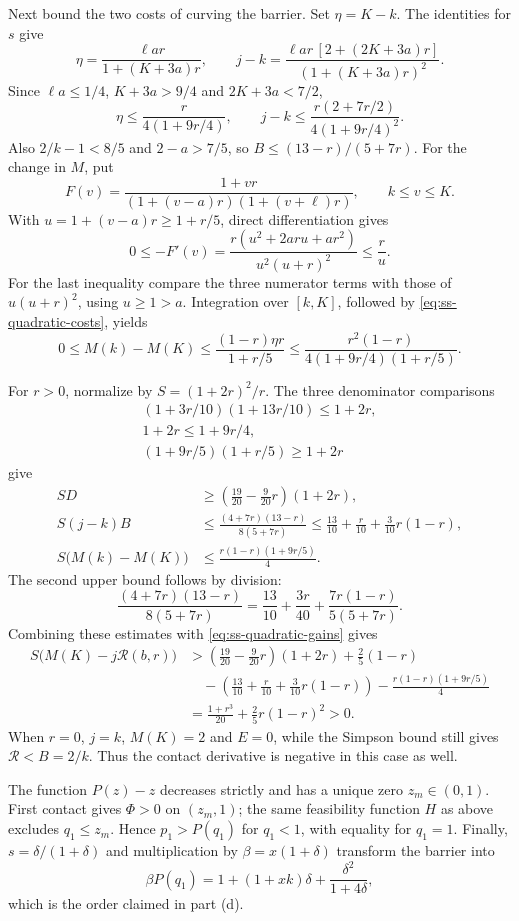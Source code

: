 Next bound the two costs of curving the barrier. Set $\eta=K-k$. The identities for $s$ give
\[
 \eta=\frac{\ell ar}{1+(K+3a)r},\qquad
 j-k=\frac{\ell ar\,[2+(2K+3a)r]}{(1+(K+3a)r)^2}.
\]
Since $\ell a\le1/4$, $K+3a>9/4$ and $2K+3a<7/2$,
\begin{equation}\label{eq:ss-quadratic-costs}
 \eta\le\frac{r}{4(1+9r/4)},\qquad
 j-k\le\frac{r(2+7r/2)}{4(1+9r/4)^2}.
\end{equation}
Also $2/k-1<8/5$ and $2-a>7/5$, so $B\le(13-r)/(5+7r)$.
For the change in $M$, put
\[
 F(v)=\frac{1+vr}{(1+(v-a)r)(1+(v+\ell)r)},\qquad k\le v\le K.
\]
With $u=1+(v-a)r\ge1+r/5$, direct differentiation gives
\[
 0\le-F'(v)=\frac{r(u^2+2aru+ar^2)}{u^2(u+r)^2}\le\frac r u.
\]
For the last inequality compare the three numerator terms with those of $u(u+r)^2$,
using $u\ge1>a$. Integration over $[k,K]$, followed by \eqref{eq:ss-quadratic-costs}, yields
\[
 0\le M(k)-M(K)\le\frac{(1-r)\eta r}{1+r/5}
 \le\frac{r^2(1-r)}{4(1+9r/4)(1+r/5)}.
\]

For $r>0$, normalize by $S=(1+2r)^2/r$.
The three denominator comparisons
\begin{gather*}
 (1+3r/10)(1+13r/10)\le1+2r,\\
 1+2r\le1+9r/4,\\
 (1+9r/5)(1+r/5)\ge1+2r
\end{gather*}
give
\begin{align*}
 SD&\ge\left(\frac{19}{20}-\frac9{20}r\right)(1+2r),\\
 S(j-k)B&\le\frac{(4+7r)(13-r)}{8(5+7r)}
       \le\frac{13}{10}+\frac r{10}+\frac3{10}r(1-r),\\
 S\bigl(M(k)-M(K)\bigr)&\le\frac{r(1-r)(1+9r/5)}4.
\end{align*}
The second upper bound follows by division:
\[
 \frac{(4+7r)(13-r)}{8(5+7r)}
 =\frac{13}{10}+\frac{3r}{40}+\frac{7r(1-r)}{5(5+7r)}.
\]
Combining these estimates with \eqref{eq:ss-quadratic-gains} gives
\begin{align*}
 S\bigl(M(K)-j\mathcal R(b,r)\bigr)
 &>\left(\frac{19}{20}-\frac9{20}r\right)(1+2r)+\frac25(1-r)\\
 &\quad-\left(\frac{13}{10}+\frac r{10}+\frac3{10}r(1-r)\right)
       -\frac{r(1-r)(1+9r/5)}4\\
 &=\frac{1+r^3}{20}+\frac25r(1-r)^2>0.
\end{align*}
When $r=0$, $j=k$, $M(K)=2$ and $E=0$, while the Simpson bound still gives
$\mathcal R<B=2/k$. Thus the contact derivative is negative in this case as well.

The function $P(z)-z$ decreases strictly and has a unique zero $z_m\in(0,1)$.
First contact gives $\Phi>0$ on $(z_m,1)$; the same feasibility function $H$ as above excludes
$q_1\le z_m$. Hence $p_1>P(q_1)$ for $q_1<1$, with equality for $q_1=1$.
Finally, $s=\delta/(1+\delta)$ and multiplication by $\beta=x(1+\delta)$ transform the barrier into
\[
 \beta P(q_1)=1+(1+xk)\delta+\frac{\delta^2}{1+4\delta},
\]
which is the order claimed in part (d).


